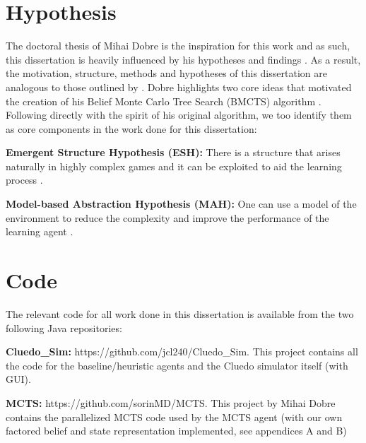 \documentclass[msc, deptreport, ai, romanprepages]{infthesis}
\begin{document}
\section{Hypothesis}
The doctoral thesis of Mihai Dobre is the inspiration for this work and as such, this dissertation is heavily influenced by his hypotheses and findings \cite{Mihai}. As a result, the motivation, structure, methods and hypotheses of this dissertation are analogous to those outlined by \cite{Mihai}. Dobre highlights two core ideas that motivated the creation of his Belief Monte Carlo Tree Search (BMCTS) algorithm \cite{Mihai}. Following directly with the spirit of his original algorithm, we too identify them as core components in the work done for this dissertation:
\begin{description}
\item \textbf{Emergent Structure Hypothesis (ESH):} There is a structure that arises naturally in highly complex games and it can be exploited to aid the learning process \cite{Mihai}.
\item \textbf{Model-based Abstraction Hypothesis (MAH):} One can use a model of the environment to reduce the complexity and improve the performance of the learning agent \cite{Mihai}.
\end{description}


\section{Code}
The relevant code for all work done in this dissertation is available from the two following Java repositories:
\begin{description}
\item \textbf{Cluedo\_Sim:} https://github.com/jcl240/Cluedo\_Sim. This project contains all the code for the baseline/heuristic agents and the Cluedo simulator itself (with GUI). 
\item \textbf{MCTS:} https://github.com/sorinMD/MCTS. This project by Mihai Dobre contains the parallelized MCTS code used by the MCTS agent (with our own factored belief and state representation implemented, see appendices A and B)
\end{description}
\end{document}
